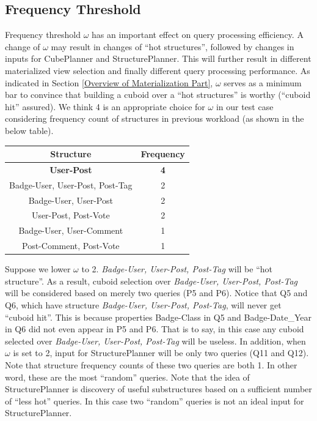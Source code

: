 \subsection{Frequency Threshold}
\label{Frequency Threshold}
Frequency threshold $\omega$ has an important effect on query processing efficiency. A change of $\omega$ may result in changes of ``hot structures'', followed by changes in inputs for CubePlanner and StructurePlanner. This will further result in different materialized view selection and finally different query processing performance. As indicated in Section \ref{Overview of Materialization Part}, $\omega$ serves as a minimum bar to convince that building a cuboid over a ``hot structures'' is worthy (``cuboid hit'' assured). We think 4 is an appropriate choice for $\omega$ in our test case considering frequency count of structures in previous workload (as shown in the below table). 

\begin{center}
\begin{tabular}{ | c | c |}  
	\hline
	Structure	&Frequency	\\ \hline 
	\textbf{User-Post} 	&\textbf{4} \\ \hline
	Badge-User, User-Post, Post-Tag 	&2 \\ \hline
	Badge-User, User-Post	&2 \\ \hline
	User-Post, Post-Vote	&2 \\ \hline
	Badge-User, User-Comment	&1 \\ \hline
	Post-Comment, Post-Vote	&1 \\ \hline
\end{tabular}
\end {center}

Suppose we lower $\omega$ to 2. \textit{Badge-User, User-Post, Post-Tag} will be ``hot structure''. As a result, cuboid selection over \textit{Badge-User, User-Post, Post-Tag} will be considered based on merely two queries (P5 and P6). Notice that Q5 and Q6, which have structure \textit{Badge-User, User-Post, Post-Tag}, will never get ``cuboid hit''. This is because properties Badge-Class in Q5 and Badge-Date_Year in Q6 did not even appear in P5 and P6. That is to say, in this case any cuboid selected over \textit{Badge-User, User-Post, Post-Tag} will be useless. In addition, when $\omega$ is set to 2, input for StructurePlanner will be only two queries (Q11 and Q12). Note that structure frequency counts of these two queries are both 1. In other word, these are the most ``random'' queries. Note that the idea of StructurePlanner is discovery of useful substructures based on a sufficient number of ``less hot'' queries. In this case two ``random'' queries is not an ideal input for StructurePlanner.  

